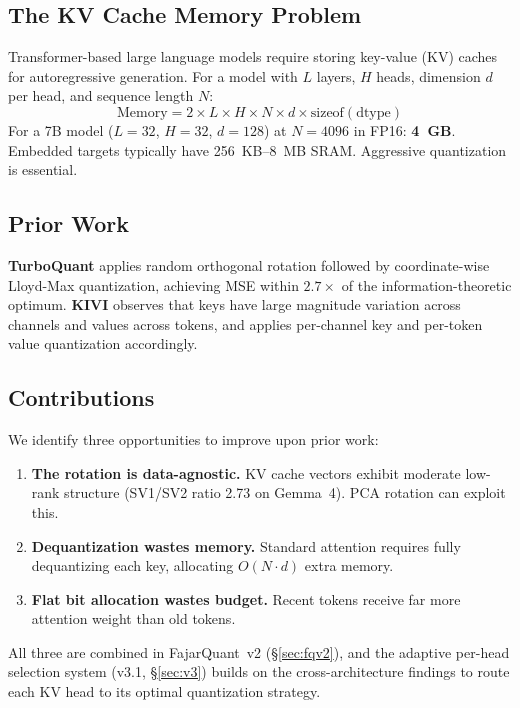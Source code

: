 \documentclass[10pt,twocolumn]{article}
\begin{document}
\subsection{The KV Cache Memory Problem}

Transformer-based large language models require storing key-value (KV) caches for autoregressive generation. For a model with $L$ layers, $H$ heads, dimension $d$ per head, and sequence length $N$:
\begin{equation}
\text{Memory} = 2 \times L \times H \times N \times d \times \text{sizeof}(\text{dtype})
\end{equation}
For a 7B model ($L{=}32$, $H{=}32$, $d{=}128$) at $N{=}4096$ in FP16: \textbf{4~GB}. Embedded targets typically have 256~KB--8~MB SRAM. Aggressive quantization is essential.

\subsection{Prior Work}

\textbf{TurboQuant} \citep{zandieh2025turboquant} applies random orthogonal rotation followed by coordinate-wise Lloyd-Max quantization, achieving MSE within $2.7\times$ of the information-theoretic optimum. \textbf{KIVI} \citep{liu2024kivi} observes that keys have large magnitude variation across channels and values across tokens, and applies per-channel key and per-token value quantization accordingly.

\subsection{Contributions}

We identify three opportunities to improve upon prior work:
\begin{enumerate}[nosep]
\item \textbf{The rotation is data-agnostic.} KV cache vectors exhibit moderate low-rank structure (SV1/SV2 ratio 2.73 on Gemma~4). PCA rotation can exploit this.
\item \textbf{Dequantization wastes memory.} Standard attention requires fully dequantizing each key, allocating $O(N \cdot d)$ extra memory.
\item \textbf{Flat bit allocation wastes budget.} Recent tokens receive far more attention weight than old tokens.
\end{enumerate}
All three are combined in FajarQuant~v2 (\S\ref{sec:fqv2}), and the
adaptive per-head selection system (v3.1, \S\ref{sec:v3}) builds on
the cross-architecture findings to route each KV head to its optimal
quantization strategy.
\end{document}
